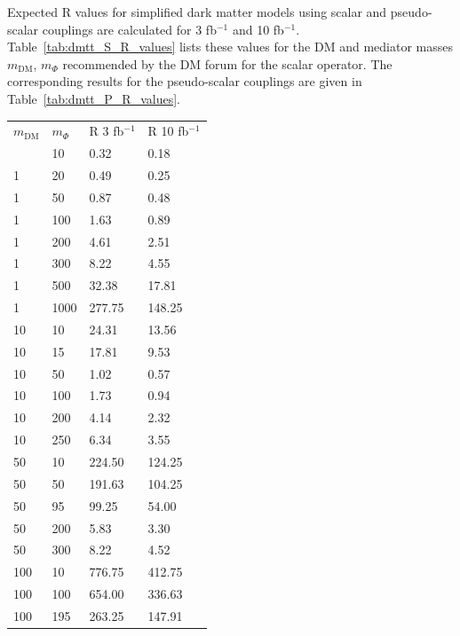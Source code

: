 Expected R values for simplified dark matter models using scalar and pseudo-scalar couplings are calculated for 3 fb$^{-1 }$ and 10 fb$^{-1 }$. Table~\ref{tab:dmtt_S_R_values} lists these
values for the DM and mediator masses $m_\textrm{DM}$, $m_\Phi$ recommended by the DM forum for the scalar operator. The corresponding results for the pseudo-scalar couplings are given in Table~\ref{tab:dmtt_P_R_values}. 

\begin{table}[h]
\centering
\begin{tabular}{llll}
\hline                      
 $m_\textrm{DM}$ & $m_\Phi$  & R 3 fb$^{-1}$ & R 10 fb$^{-1}$ \\ \hlin
1       & 10      & 0.32    & 0.18 \\ \hline
1       & 20      & 0.49    & 0.25 \\ \hline
1       & 50      & 0.87    & 0.48 \\ \hline
1       & 100     & 1.63    & 0.89 \\ \hline
1       & 200     & 4.61    & 2.51 \\ \hline
1       & 300     & 8.22    & 4.55 \\ \hline
1       & 500     & 32.38   & 17.81 \\ \hline
1       & 1000    & 277.75  & 148.25 \\ \hline
10      & 10      & 24.31   & 13.56 \\ \hline
10      & 15      & 17.81   & 9.53 \\ \hline
10      & 50      & 1.02    & 0.57 \\ \hline
10      & 100     & 1.73    & 0.94 \\ \hline
10      & 200     & 4.14    & 2.32 \\ \hline
10      & 250     & 6.34    & 3.55 \\ \hline
50      & 10      & 224.50  & 124.25 \\ \hline
50      & 50      & 191.63  & 104.25 \\ \hline
50      & 95      & 99.25   & 54.00 \\ \hline
50      & 200     & 5.83    & 3.30 \\ \hline
50      & 300     & 8.22    & 4.52 \\ \hline
100     & 10      & 776.75  & 412.75 \\ \hline
100     & 100     & 654.00  & 336.63 \\ \hline
100     & 195     & 263.25  & 147.91 \\ \hline

\end{tabular}
\end{table}

